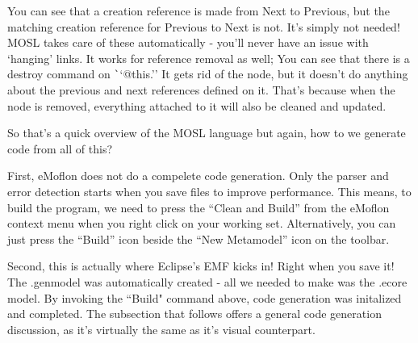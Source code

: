 \newpage
\texHeader

You can see that a creation reference is made from Next to Previous, but the matching creation reference for Previous to Next is not. It's simply not needed! MOSL takes care of these automatically - you'll never have an issue with `hanging' links. It works for reference removal as well; You can see that there is a destroy command on {\texttt ``@this.''} It gets rid of the node, but it doesn't do anything about the previous and next references defined on it. That's because when the node is removed, everything attached to it will also be cleaned and updated.
 
So that's a quick overview of the MOSL language but again, how to we generate code from all of this?

First, eMoflon does not do a compelete code generation. Only the parser and error detection starts when you save files to improve performance. This means, to build the program, we need to press the ``Clean and Build'' from the eMoflon context menu when you right click on your working set. Alternatively, you can just press the ``Build'' icon beside the ``New Metamodel'' icon on the toolbar. 

Second, this is actually where Eclipse's EMF kicks in! Right when you save it! The .genmodel was automatically created - all we needed to make was the .ecore model. By invoking the ``Build" command above, code generation was initalized and completed. The subsection that follows offers a general code generation discussion, as it's virtually the same as it's visual counterpart.